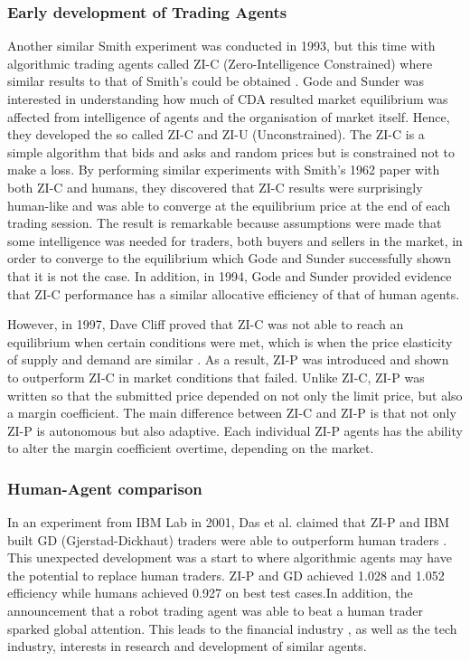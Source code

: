 \subsubsection{Early development of Trading Agents}
Another similar Smith experiment was conducted in 1993, but this time with algorithmic trading agents called ZI-C (Zero-Intelligence Constrained) where similar results to that of Smith’s could be obtained \cite{godesunder93}. Gode and Sunder was interested in understanding how much of CDA resulted market equilibrium was affected from intelligence of agents and the organisation of market itself. Hence, they developed the so called ZI-C and ZI-U (Unconstrained). The ZI-C is a simple algorithm that bids and asks and random prices but is constrained not to make a loss. By performing similar experiments with Smith’s 1962 \cite{smith1962} paper with both ZI-C and humans, they discovered that ZI-C results were surprisingly human-like and was able to converge at the equilibrium price at the end of each trading session. The result is remarkable because assumptions were made that some intelligence was needed for traders, both buyers and sellers in the market, in order to converge to the equilibrium which Gode and Sunder successfully shown that it is not the case. In addition, in 1994, Gode and Sunder provided evidence that ZI-C performance has a similar allocative efficiency of that of human agents. 

However, in 1997, Dave Cliff proved that ZI-C was not able to reach an equilibrium when certain conditions were met, which is when the price elasticity of supply and demand are similar \cite{zip1997}. As a result, ZI-P was introduced and shown to outperform ZI-C in market conditions that failed. Unlike ZI-C, ZI-P was written so that the submitted price depended on not only the limit price, but also a margin coefficient. The main difference between ZI-C and ZI-P is that not only ZI-P is autonomous but also adaptive. Each individual ZI-P agents has the ability to alter the margin coefficient overtime, depending on the market. 

\subsubsection{Human-Agent comparison}
In an experiment from IBM Lab in 2001, Das et al. claimed that ZI-P and IBM built GD (Gjerstad-Dickhaut) traders were able to outperform human traders \cite{das2001}. This unexpected development was a start to where algorithmic agents may have the potential to replace human traders. ZI-P and GD achieved 1.028 and 1.052 efficiency while humans achieved 0.927 on best test cases.In addition, the announcement that a robot trading agent was able to beat a human trader sparked global attention. This leads to the financial industry , as well as the tech industry, interests in research and development of similar agents. 

